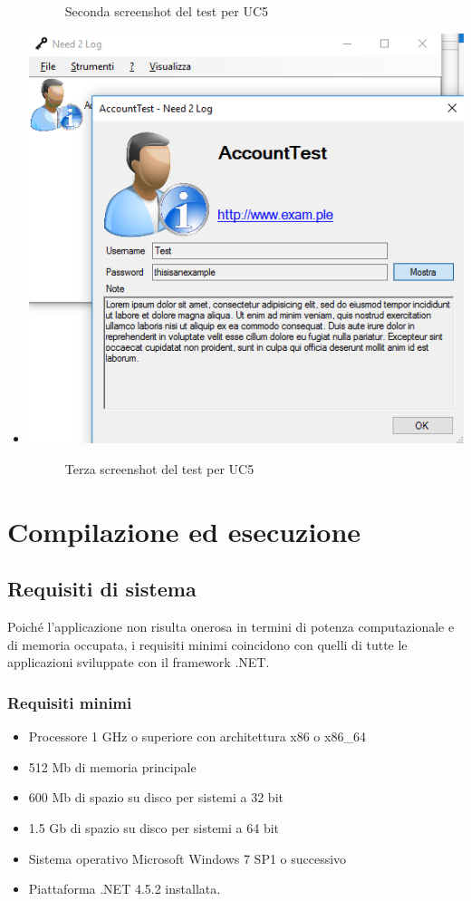 \documentclass[a4paper,10pt]{report}
\begin{document}
\begin{itemize}
{\begin{center}
							\end{center}
						\begin{figure}[!h]
								\caption{Seconda screenshot del test per UC5}
							\end{figure}}
					\item[] {
						\begin{center}
							\includegraphics[scale=1]{immagini/test/testUC5_3.png}
							\end{center}
						\begin{figure}[!h]
								\caption{Terza screenshot del test per UC5}
							\end{figure}}
					\end{itemize}
\newpage
\chapter{Compilazione ed esecuzione} %
	\section{Requisiti di sistema}
		Poiché l’applicazione non risulta onerosa in termini di potenza
			computazionale e di memoria occupata, i requisiti minimi coincidono
			con quelli di tutte le applicazioni sviluppate con il framework .NET.
		\subsection{Requisiti minimi}
			\begin{itemize}
				\item Processore 1 GHz o superiore con architettura x86 o x86\_64
				\item 512 Mb di memoria principale
				\item 600 Mb di spazio su disco per sistemi a 32 bit
				\item 1.5 Gb di spazio su disco per sistemi a 64 bit
				\item Sistema operativo Microsoft Windows 7 SP1 o successivo
				\item Piattaforma .NET 4.5.2 installata.
			\end{itemize}
\end{document}
